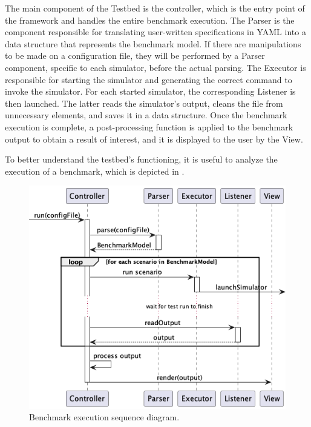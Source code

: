 \documentclass[12pt,a4paper,openright,twoside]{book}
\begin{document}
The main component of the Testbed is the controller, which is the entry point of the framework and handles the entire benchmark execution.
The Parser is the component responsible for translating user-written specifications in YAML into a data structure that represents the benchmark model.
If there are manipulations to be made on a configuration file, they will be performed by a Parser component, specific to each simulator, before the actual parsing.
The Executor is responsible for starting the simulator and generating the correct command to invoke the simulator.
For each started simulator, the corresponding Listener is then launched. 
The latter reads the simulator's output, cleans the file from unnecessary elements, and saves it in a data structure.
Once the benchmark execution is complete, a post-processing function is applied to the benchmark output to obtain a result of interest, and it is displayed to the user by the View.

To better understand the testbed's functioning, it is useful to analyze the execution of a benchmark, which is depicted in .

\begin{figure}[h!]
  \centering
  \includegraphics[width=\textwidth]{figures/execution-sequence-diagram.png}
  \caption{Benchmark execution sequence diagram.}
  \label{fig:benchmark-sequence-diagram}
\end{figure}
\end{document}
